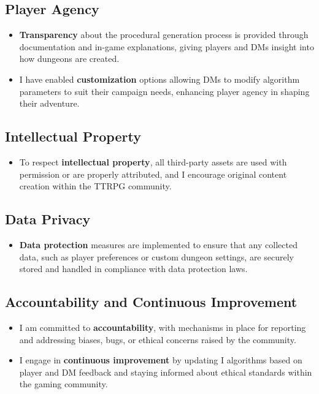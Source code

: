 \documentclass[10pt,twocolumn]{article}
\begin{document}
\subsection{Player Agency}
\begin{itemize}
    \item \textbf{Transparency} about the procedural generation process is provided through documentation and in-game explanations, giving players and DMs insight into how dungeons are created.
    \item I have enabled \textbf{customization} options allowing DMs to modify algorithm parameters to suit their campaign needs, enhancing player agency in shaping their adventure.
\end{itemize}

\subsection{Intellectual Property}
\begin{itemize}
    \item To respect \textbf{intellectual property}, all third-party assets are used with permission or are properly attributed, and I encourage original content creation within the TTRPG community.
\end{itemize}

\subsection{Data Privacy}
\begin{itemize}
    \item \textbf{Data protection} measures are implemented to ensure that any collected data, such as player preferences or custom dungeon settings, are securely stored and handled in compliance with data protection laws.
\end{itemize}

\subsection{Accountability and Continuous Improvement}
\begin{itemize}
    \item I am committed to \textbf{accountability}, with mechanisms in place for reporting and addressing biases, bugs, or ethical concerns raised by the community.
    \item I engage in \textbf{continuous improvement} by updating I algorithms based on player and DM feedback and staying informed about ethical standards within the gaming community.
\end{itemize}
\end{document}
